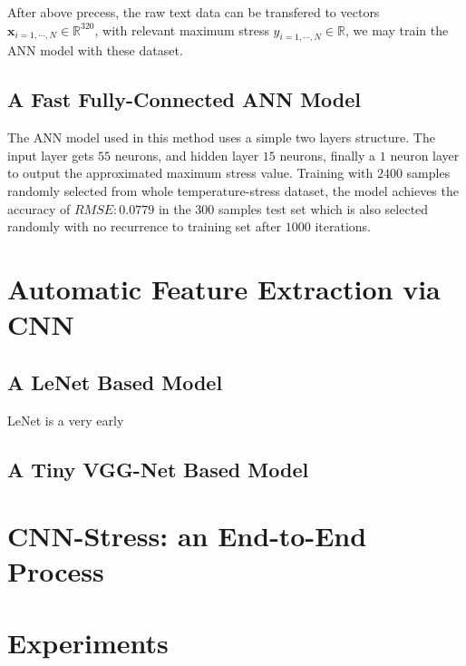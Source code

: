After above precess, the raw text data can be transfered to vectors 
$\mathbf{x}_{i=1,\cdots,N} \in \mathbb{R}^{320}$, with relevant maximum stress 
$y_{i=1,\cdots,N} \in \mathbb{R}$,
we may train the ANN model with these dataset.

\subsection{A Fast Fully-Connected ANN Model}
The ANN model used in this method uses a simple two layers structure. 
The input layer gets $55$ neurons, and hidden layer $15$ neurons, finally a $1$ neuron layer
to output the approximated maximum stress value.
Training with $2400$ samples randomly selected from whole temperature-stress dataset,
the model achieves the accuracy of $RMSE: 0.0779$ in the $300$ samples test set 
which is also selected randomly with no recurrence to training set after $1000$ iterations.

\section{Automatic Feature Extraction via CNN}
\subsection{A LeNet Based Model}
LeNet is a very early 
\subsection{A Tiny VGG-Net Based Model}

\section{CNN-Stress: an End-to-End Process}

\section{Experiments}
